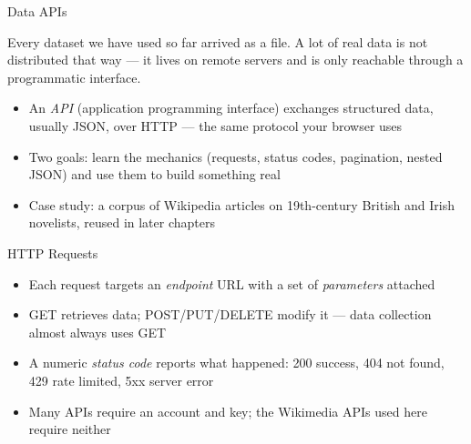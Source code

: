 \documentclass[8pt,aspectratio=169]{beamer}
\begin{document}
\begin{textframe}{Data APIs}

Every dataset we have used so far arrived as a file. A lot of real data is not distributed that way --- it lives on remote servers and is only reachable through a programmatic interface.

\begin{itemize}
\item An \textit{API} (application programming interface) exchanges structured data, usually JSON, over HTTP --- the same protocol your browser uses
\item Two goals: learn the mechanics (requests, status codes, pagination, nested JSON) and use them to build something real
\item Case study: a corpus of Wikipedia articles on 19th-century British and Irish novelists, reused in later chapters
\end{itemize}

\end{textframe}

\begin{textframe}{HTTP Requests}

\begin{itemize}
\item Each request targets an \textit{endpoint} URL with a set of \textit{parameters} attached
\item GET retrieves data; POST/PUT/DELETE modify it --- data collection almost always uses GET
\item A numeric \textit{status code} reports what happened: 200 success, 404 not found, 429 rate limited, 5xx server error
\item Many APIs require an account and key; the Wikimedia APIs used here require neither
\end{itemize}

\end{textframe}
\end{document}
